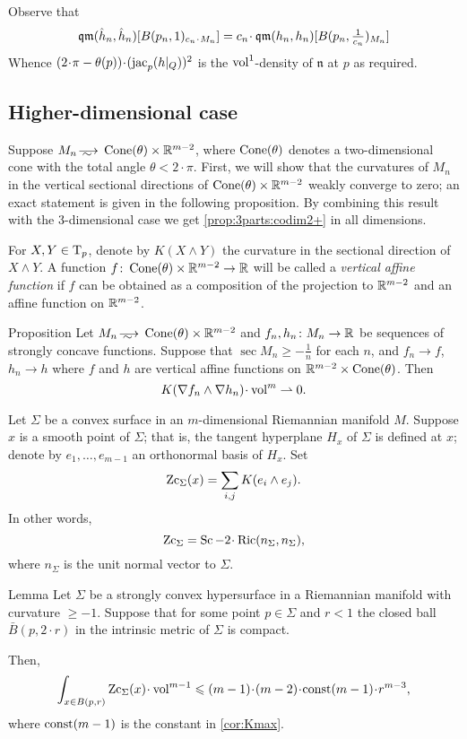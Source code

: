 Observe that 
\[\qm(\hat h_n, \hat h_n)[B(p_n,1)_{c_n\cdot M_n}]
=
c_n\cdot \qm(h_n, h_n)[B(p_n,\tfrac1{c_n})_{M_n}]\]
Whence $(2\cdot \pi-\theta(p))\cdot(\jac_p(h|_Q))^2$ is the $\operatorname{vol}^1$-density of $\mathfrak n$ at $p$ as required.
\qeds

\subsection{Higher-dimensional case}


Suppose $M_n\smooths{} \Cone(\theta)\times \RR^{m-2}$, where $\operatorname{Cone}(\theta)$ denotes a two-dimensional cone with the total angle $\theta<2\cdot\pi$.
First, we will show that the curvatures of $M_n$ in the vertical sectional directions of $\operatorname{Cone}(\theta)\times \mathbb{R}^{m-2}$ weakly converge to zero;
an exact statement is given in the following proposition.
By combining this result with the 3-dimensional case we get \ref{prop:3parts:codim2+} in all dimensions.

For $X,Y\in \mathrm{T}_p$, denote by $K(X\wedge Y)$ the curvature in the sectional direction of $X\wedge Y$.
A function $f\colon\operatorname{Cone}(\theta)\times\mathbb{R}^{m-2}\to\mathbb{R}$ will be called a \emph{vertical affine function} if $f$ can be obtained as a composition of the projection to $\mathbb{R}^{m-2}$ and an affine function on $\mathbb{R}^{m-2}$.

\begin{thm}{Proposition}\label{prop:vert-vert}
Let $M_n\smooths{} \Cone(\theta)\times\RR^{m-2}$
and $f_n,h_n\: M_n\zz\to \RR$ be sequences of strongly concave functions.
Suppose that $\sec M_n\ge -\tfrac1n$ for each $n$,
and $f_n\to f$, 
$h_n\to h$ where $f$ and $h$ are vertical affine functions on $\mathbb{R}^{m-2}\times \operatorname{Cone}(\theta)$.
Then 
\[K(\nabla f_n\wedge\nabla h_n)\cdot\vol^m \rightharpoonup0.\]

\end{thm}

Let $\Sigma$ be a convex surface in an $m$-dimensional Riemannian manifold $M$.
Suppose $x$ is a smooth point of $\Sigma$; that is, the tangent hyperplane $H_x$ of $\Sigma$ is defined at $x$;
denote by $e_1,\dots,e_{m-1}$ an orthonormal basis of $H_x$.
Set 
\[\operatorname{\rm Zc}_\Sigma(x)= \sum_{i,j} K(e_i\wedge e_j).\]
In other words, 
\[\Zc_\Sigma=\Sc-2\cdot\Ric(n_\Sigma,n_\Sigma),\]
where $n_\Sigma$ is the unit normal vector to $\Sigma$.

\begin{thm}{Lemma}\label{lem:nonsmooth-convex}
Let $\Sigma$ be a strongly convex hypersurface in a Riemannian manifold with curvature $\ge -1$.
Suppose that for some point $p\in \Sigma$ and $r<1$ the closed ball $\bar B(p,2\cdot r)$ in the intrinsic metric of $\Sigma$ is compact.

Then, 
\[\int_{x\in B(p,r)}\Zc_\Sigma(x)\cdot \vol^{m-1}\le (m-1)\cdot(m-2)\cdot\const(m-1)\cdot r^{m-3},\]
where $\mathrm{const}(m-1)$ is the constant in \ref{cor:Kmax}.
\end{thm}


